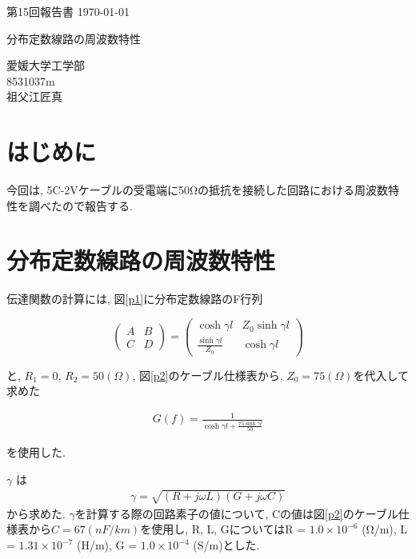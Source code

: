 \documentclass[a4j,12pt,]{jarticle}
\begin{document}
{\noindent\small 第15回報告書 \hfill\today}
\begin{center}
  {\Large 分布定数線路の周波数特性}
\end{center}
\begin{flushright}
  愛媛大学工学部 \\
  8531037m \\
  祖父江匠真 \\
\end{flushright}

\section{はじめに}

今回は, 5C-2Vケーブルの受電端に50Ωの抵抗を接続した回路における周波数特性を調べたので報告する.

\section{分布定数線路の周波数特性}

伝達関数の計算には, 図\ref{p1}に分布定数線路のF行列

\large
\[
  \left(
  \begin{array}{cc}
      A & B \\
      C & D
    \end{array}
  \right) =
  \left(
  \begin{array}{cc}
      \cosh\gamma l             & Z_0\sinh\gamma l \\
      \frac{\sinh\gamma l}{Z_0} & \cosh\gamma l
    \end{array}
  \right)
\]
\normalsize

と, $R_1 = 0$, $R_2 = 50(Ω)$, 図\ref{p2}のケーブル仕様表から, $Z_0 = 75(Ω)$を代入して求めた

\large
\begin{eqnarray}
  G(f) =  \frac{1}{\cosh\gamma l + \frac{75\sinh\gamma l}{50}}
\end{eqnarray}
\normalsize

を使用した.

$\gamma$ は
\begin{eqnarray}
  \gamma =  \sqrt{(R + j\omega L)(G + j\omega C)}
\end{eqnarray}
から求めた.
$\gamma$を計算する際の回路素子の値について, Cの値は図\ref{p2}のケーブル仕様表から$C = 67(nF/km)$を使用し, 
R, L, GについてはR = $1.0 × 10^{-6}$ (Ω/m), L = $1.31 × 10^{-7}$ (H/m), G = $1.0 × 10^{-4}$ (S/m)とした.
\end{document}

